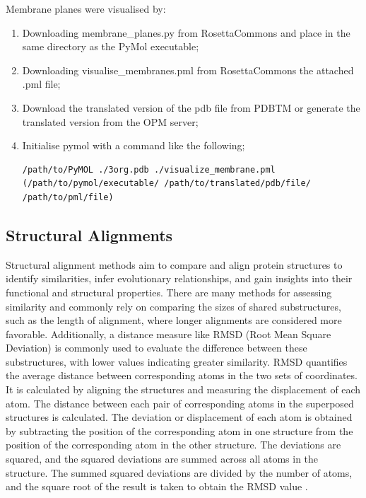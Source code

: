 Membrane planes were visualised by:

\begin{enumerate}
\item Downloading membrane\_planes.py \cite{baugh2011real} from RosettaCommons and place in the same directory as the PyMol executable;
\item Downloading visualise\_membranes.pml from RosettaCommons the attached .pml \cite{baugh2011real} file;
\item Download the translated version of the pdb file from PDBTM or generate the translated version from the OPM server; 
\item Initialise pymol with a command like the following;  
\begin{lstlisting}[style=linux-terminal]
/path/to/PyMOL ./3org.pdb ./visualize_membrane.pml  (/path/to/pymol/executable/ /path/to/translated/pdb/file/ /path/to/pml/file)
\end{lstlisting}

\end{enumerate}

\subsection{Structural Alignments}
Structural alignment methods aim to compare and align protein structures to identify similarities, infer evolutionary relationships, and gain insights into their functional and structural properties. There are many methods for assessing similarity \cite{Holm2016,orengo199636,falicov1996surface,krissinel2004secondary} and commonly rely on comparing the sizes of shared substructures, such as the length of alignment, where longer alignments are considered more favorable. Additionally, a distance measure like RMSD (Root Mean Square Deviation) is commonly used to evaluate the difference between these substructures, with lower values indicating greater similarity.  RMSD  quantifies the average distance between corresponding atoms in the two sets of coordinates. It is calculated by aligning the structures and measuring the displacement of each atom.  The distance between each pair of corresponding atoms in the superposed structures is calculated. The deviation or displacement of each atom is obtained by subtracting the position of the corresponding atom in one structure from the position of the corresponding atom in the other structure. The deviations are squared, and the squared deviations are summed across all atoms in the structure. The summed squared deviations are divided by the number of atoms, and the square root of the result is taken to obtain the RMSD value \cite{yusuf2008alternative}.  

